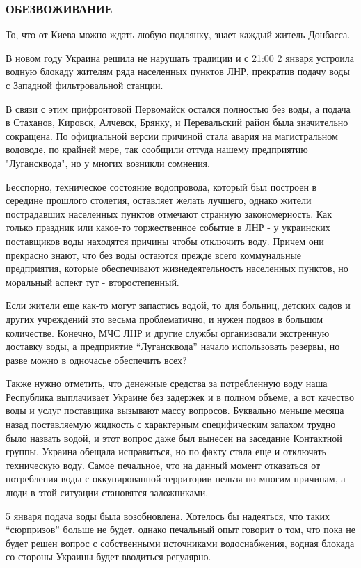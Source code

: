 \subsubsection{ОБЕЗВОЖИВАНИЕ}

То, что от Киева можно ждать любую подлянку, знает каждый житель Донбасса.

В новом году Украина решила не нарушать традиции и с 21:00 2 января устроила
водную блокаду жителям ряда населенных пунктов ЛНР, прекратив подачу воды с
Западной фильтровальной станции.

В связи с этим прифронтовой Первомайск остался полностью без воды, а подача в
Стаханов, Кировск, Алчевск, Брянку, и Перевальский район была значительно
сокращена. По официальной версии причиной стала авария на магистральном
водоводе, по крайней мере, так сообщили оттуда нашему предприятию
"Лугансквода", но у многих возникли сомнения.

Бесспорно, техническое состояние водопровода, который был построен в середине
прошлого столетия, оставляет желать лучшего, однако жители пострадавших
населенных пунктов отмечают странную закономерность. Как только праздник или
какое-то торжественное событие в ЛНР - у украинских поставщиков воды находятся
причины чтобы отключить воду. Причем они прекрасно знают, что без воды остаются
прежде всего коммунальные предприятия, которые обеспечивают жизнедеятельность
населенных пунктов, но моральный аспект тут - второстепенный.

Если жители еще как-то могут запастись водой, то для больниц, детских садов и
других учреждений это весьма проблематично, и нужен подвоз в большом
количестве. Конечно, МЧС ЛНР и другие службы организовали экстренную доставку
воды, а предприятие \enquote{Лугансквода} начало использовать резервы, но разве можно в
одночасье обеспечить всех?

Также нужно отметить, что денежные средства за потребленную воду наша
Республика выплачивает Украине без задержек и в полном объеме, а вот качество
воды и услуг поставщика вызывают массу вопросов. Буквально меньше месяца назад
поставляемую жидкость с характерным специфическим запахом трудно было назвать
водой, и этот вопрос даже был вынесен на заседание Контактной группы. Украина
обещала исправиться, но по факту стала еще и отключать техническую воду. Самое
печальное, что на данный момент отказаться от потребления воды с оккупированной
территории нельзя по многим причинам, а люди в этой ситуации становятся
заложниками.

5 января подача воды была возобновлена. Хотелось бы надеяться, что таких
\enquote{сюрпризов} больше не будет, однако печальный опыт говорит о том, что пока не
будет решен вопрос с собственными источниками водоснабжения, водная блокада со
стороны Украины будет вводиться регулярно.

